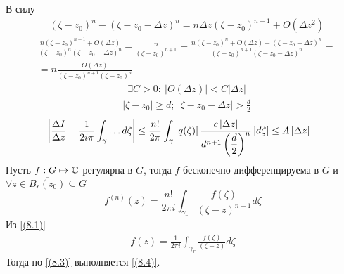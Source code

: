 В силу
\begin{align*}
  & (\zeta-z_0)^n - (\zeta - z_0 - \Delta z)^n = n\Delta z(\zeta - z_0)^{n-1} + O(\Delta z^2)
\end{align*}
\begin{align*}
  & \frac{n(\zeta-z_0)^{n-1}+O(\Delta z)}{(\zeta - z_0)^n(\zeta-z_0-\Delta z)^n} - \frac{n}{(\zeta - z_0)^{n+1}} = \frac{n(\zeta-z_0)^n+O(\Delta z) - (\zeta-z_0-\Delta z)^n}{(\zeta - z_0)^{n+1}(\zeta - z_0 - \Delta z)^n} = \\
  & = n \frac{O(\Delta z)}{(\zeta - z_0)^{n+1}(\zeta - z_0)^n}
\end{align*}
\begin{align*}
  & \exists C > 0: \ \left| O(\Delta z) \right| < C \left| \Delta z \right|
\end{align*}
\begin{align*}
  & \left| \zeta - z_0 \right| \geq d; \ \left| \zeta - z_0 - \Delta z \right| > \frac{d}{2}
\end{align*}
\begin{align*}
  & \left| \frac{\Delta I}{\Delta z} - \frac{1}{2 i\pi} \int_{\gamma}\dots d \zeta\right|\leq \frac{n!}{2 \pi}\int_{\gamma}\left| q(\zeta) \right|\frac{c\left| \Delta z \right|}{d^{n+1}\left( \displaystyle \frac{d}{2} \right)^n}\left| d\zeta \right| \leq A \left| \Delta z \right|
\end{align*}
\theorem
Пусть $f: G \mapsto \mathbb{C}$ регулярна в $G$, тогда $f$ бесконечно дифференцируема в
$G$ и $\forall z \in \overline{B_r(z_0)} \subseteq G$
\begin{equation} \label{(8.4)}
    f^{(n)}(z) = \frac{n!}{2 \pi i}\int_{\gamma_r}\frac{f(\zeta)}{(\zeta - z)^{n+1}}d\zeta
\end{equation}
\pr
Из \eqref{(8.1)}
\begin{align*}
  f(z) = \frac{1}{2 \pi i}\int_{\gamma_r}\frac{f(\zeta)}{(\zeta - z)}d\zeta
\end{align*}
Тогда по \eqref{(8.3)} выполняется \eqref{(8.4)}.

